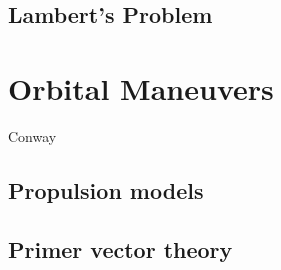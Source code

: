 \subsection{Lambert's Problem}



\section{Orbital Maneuvers}
Conway
\subsection{Propulsion models}

\subsection{Primer vector theory}

